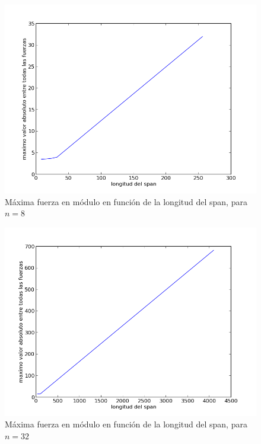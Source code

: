 \begin{figure}[!h]
	\begin{center}
		  \includegraphics[scale=0.4]{Imagenes/variable_span/n_8}
		  \caption{Máxima fuerza en módulo en función de la longitud del span, para $n=8$}
		  \label{fig:contra1}
	\end{center}
\end{figure}
\FloatBarrier

\begin{figure}[!h]
	\begin{center}
		  \includegraphics[scale=0.4]{Imagenes/variable_span/n_32}
		  \caption{Máxima fuerza en módulo en función de la longitud del span, para $n=32$}
		  \label{fig:contra1}
	\end{center}
\end{figure}
\FloatBarrier

